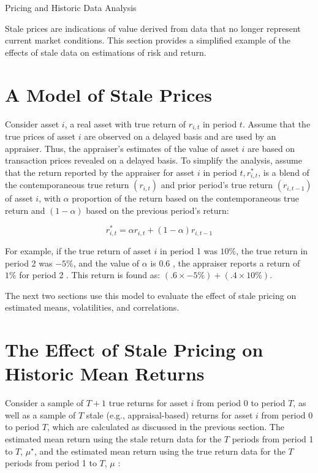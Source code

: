 \documentclass[11pt]{article}
\begin{document}
Pricing and Historic Data Analysis

Stale prices are indications of value derived from data that no longer represent current market conditions. This section provides a simplified example of the effects of stale data on estimations of risk and return.

\section*{A Model of Stale Prices}
Consider asset $i$, a real asset with true return of $r_{i, t}$ in period $t$. Assume that the true prices of asset $i$ are observed on a delayed basis and are used by an appraiser. Thus, the appraiser's estimates of the value of asset $i$ are based on transaction prices revealed on a delayed basis. To simplify the analysis, assume that the return reported by the appraiser for asset $i$ in period $t, r_{i, t}^{*}$, is a blend of the contemporaneous true return $\left(r_{i, t}\right)$ and prior period's true return $\left(r_{i, t-1}\right)$ of asset $i$, with $\alpha$ proportion of the return based on the contemporaneous true return and $(1-\alpha)$ based on the previous period's return:


\begin{equation*}
r_{i, t}^{*}=\alpha r_{i, t}+(1-\alpha) r_{i, t-1} \tag{1}
\end{equation*}


For example, if the true return of asset $i$ in period 1 was $10 \%$, the true return in period 2 was $-5 \%$, and the value of $\alpha$ is 0.6 , the appraiser reports a return of $1 \%$ for period 2 . This return is found as: $(.6 \times-5 \%)+(.4 \times 10 \%)$.

The next two sections use this model to evaluate the effect of stale pricing on estimated means, volatilities, and correlations.

\section*{The Effect of Stale Pricing on Historic Mean Returns}
Consider a sample of $T+1$ true returns for asset $i$ from period 0 to period $T$, as well as a sample of $T$ stale (e.g., appraisal-based) returns for asset $i$ from period 0 to period $T$, which are calculated as discussed in the previous section. The estimated mean return using the stale return data for the $T$ periods from period 1 to $T$, $\mu^{\star}$, and the estimated mean return using the true return data for the $T$ periods from period 1 to $T$, $\mu$ :
\end{document}
